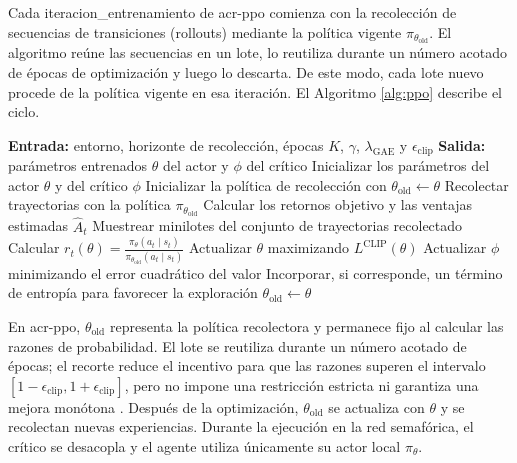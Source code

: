 Cada \gls{iteracion_entrenamiento} de \acrshort{acr-ppo} comienza con la recolección de secuencias de transiciones (\glspl{rollout}) mediante la política vigente $\pi_{\theta_{\text{old}}}$. El algoritmo reúne las secuencias en un lote, lo reutiliza durante un número acotado de épocas de optimización y luego lo descarta. De este modo, cada lote nuevo procede de la política vigente en esa iteración. El Algoritmo \ref{alg:ppo} describe el ciclo.

\begin{algorithm}[H]
\caption{Proximal Policy Optimization (\acrshort{acr-ppo})}
\label{alg:ppo}
\begin{algorithmic}[1]
\Statex \textbf{Entrada:} entorno, horizonte de recolección, épocas $K$, $\gamma$, $\lambda_{\mathrm{GAE}}$ y $\epsilon_{\mathrm{clip}}$
\Statex \textbf{Salida:} parámetros entrenados $\theta$ del actor y $\phi$ del crítico
\State Inicializar los parámetros del actor $\theta$ y del crítico $\phi$
\State Inicializar la política de recolección con $\theta_{\mathrm{old}} \leftarrow \theta$
    \State Recolectar trayectorias con la política $\pi_{\theta_{\mathrm{old}}}$
    \State Calcular los retornos objetivo y las ventajas estimadas $\hat{A}_t$
        \State Muestrear minilotes del conjunto de trayectorias recolectado
        \State Calcular $r_t(\theta) = \frac{\pi_\theta(a_t\mid s_t)}{\pi_{\theta_{\mathrm{old}}}(a_t\mid s_t)}$
        \State Actualizar $\theta$ maximizando $L^{\mathrm{CLIP}}(\theta)$
        \State Actualizar $\phi$ minimizando el error cuadrático del valor
        \State Incorporar, si corresponde, un término de entropía para favorecer la exploración
    \EndFor
    \State $\theta_{\mathrm{old}} \leftarrow \theta$
\EndFor
\end{algorithmic}
\end{algorithm}
En \acrshort{acr-ppo}, $\theta_{\mathrm{old}}$ representa la política recolectora y permanece fijo al calcular las razones de probabilidad. El lote se reutiliza durante un número acotado de épocas; el recorte reduce el incentivo para que las razones superen el intervalo $[1-\epsilon_{\mathrm{clip}},1+\epsilon_{\mathrm{clip}}]$, pero no impone una restricción estricta ni garantiza una mejora monótona \cite{schulman2017ppo}. Después de la optimización, $\theta_{\mathrm{old}}$ se actualiza con $\theta$ y se recolectan nuevas experiencias. Durante la ejecución en la red semafórica, el crítico se desacopla y el agente utiliza únicamente su actor local $\pi_\theta$.


